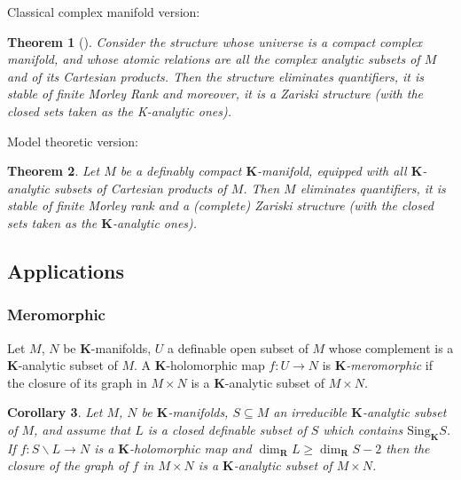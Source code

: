 \documentclass{amsart}
\newtheorem{theorem}{Theorem}[subsection]
\newtheorem{corollary}[theorem]{Corollary}
\theoremstyle{definition}
\numberwithin{equation}{section}
\begin{document}
Classical complex manifold version:
\begin{theorem}[{\cite{zbMATH00554994}}]
  Consider the structure whose universe is a compact complex manifold,
  and whose atomic relations are all the complex analytic subsets of $M$ and of its Cartesian products.
  Then the structure eliminates quantifiers,
  it is stable of finite Morley Rank and moreover,
  it is a Zariski structure
  (with the closed sets taken as the K-analytic ones).
\end{theorem}

Model theoretic version:
\begin{theorem}
  Let $M$ be a definably compact $\mathbf{K}$-manifold,
  equipped with all $\mathbf{K}$-analytic subsets of Cartesian products of $M$.
  Then $M$ eliminates quantifiers,
  it is stable of finite Morley rank and a (complete) Zariski structure
  (with the closed sets taken as the $\mathbf{K}$-analytic ones).
\end{theorem}

\subsection{Applications}
\subsubsection{Meromorphic}
Let $M$, $N$ be $\mathbf{K}$-manifolds,
$U$ a definable open subset of $M$
whose complement is a $\mathbf{K}$-analytic subset of $M$.
A $\mathbf{K}$-holomorphic map $f: U \to N$ is
\emph{$\mathbf{K}$-meromorphic} if the closure of its graph in $M \times N$
is a $\mathbf{K}$-analytic subset of $M \times N$.

\begin{corollary}
  Let $M$, $N$ be $\mathbf{K}$-manifolds,
  $S \subseteq M$ an irreducible $\mathbf{K}$-analytic subset of $M$,
  and assume that $L$ is a closed definable subset of $S$ which contains $\mathrm{Sing}_{\mathbf{K}}S$.
  If $f: S \backslash L \to N$ is a $\mathbf{K}$-holomorphic map and
  $\dim_{\mathbf{R}}L \ge \dim_{\mathbf{R}}S -2$ then
  the closure of the graph of $f$ in $M \times N$ is a $\mathbf{K}$-analytic subset of $M \times N$.
\end{corollary}
\end{document}
